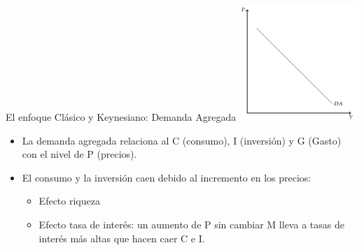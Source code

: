 \documentclass{beamer}
\begin{document}
\begin{frame}{El enfoque Clásico y Keynesiano: Demanda Agregada}
    \centering\includegraphics[width=4.5cm]{../Figures/C33.4.png}
    \begin{itemize}
        \item La demanda agregada relaciona al C (consumo), I (inversión) y G (Gasto) con el nivel de P (precios).
        \item El consumo y la inversión caen debido al incremento en los precios:
        \begin{itemize}
            \item Efecto riqueza
            \item Efecto tasa de interés: un aumento de P sin cambiar M lleva a tasas de interés más altas que hacen caer C e I.
        \end{itemize}
    \end{itemize}
\end{frame}
\end{document}
